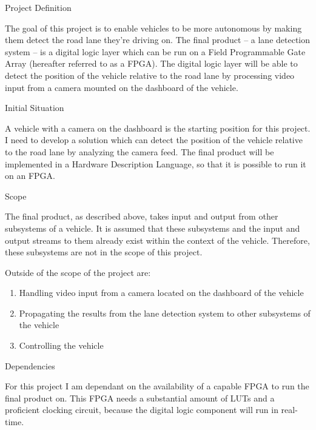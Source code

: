 \documentclass{matthijs}
\begin{document}
	\begin{hoofdstuk}{Project Definition}

		The goal of this project is to enable vehicles to be more autonomous by making them detect the road lane they're driving on.
		The final product -- a lane detection system -- is a digital logic layer which can be run on a Field Programmable Gate Array (hereafter referred to as a FPGA).
		The digital logic layer will be able to detect the position of the vehicle relative to the road lane by processing video input from a camera mounted on the dashboard of the vehicle.

		\begin{paragraaf}{Initial Situation}
			
			A vehicle with a camera on the dashboard is the starting position for this project.
			I need to develop a solution which can detect the position of the vehicle relative to the road lane by analyzing the camera feed.
			The final product will be implemented in a Hardware Description Language, so that it is possible to run it on an FPGA.
		
		\end{paragraaf}

		\begin{paragraaf}{Scope}

			The final product, as described above, takes input and output from other subsystems of a vehicle.
			It is assumed that these subsystems and the input and output streams to them already exist within the context of the vehicle.
			Therefore, these subsystems are not in the scope of this project.
			
			Outside of the scope of the project are:

			\begin{enumerate}
			
				\item Handling video input from a camera located on the dashboard of the vehicle
				\item Propagating the results from the lane detection system to other subsystems of the vehicle
				\item Controlling the vehicle
			
			\end{enumerate}

		\end{paragraaf}

		\begin{paragraaf}{Dependencies}

			For this project I am dependant on the availability of a capable FPGA to run the final product on.
			This FPGA needs a substantial amount of LUTs and a proficient clocking circuit, because the digital logic component will run in real-time.
			

\end{paragraaf}
\end{hoofdstuk}
\end{document}

